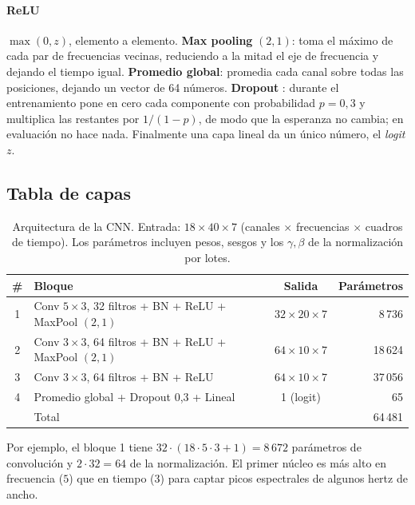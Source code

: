 \paragraph{ReLU} $\max(0, z)$, elemento a elemento. \textbf{Max pooling} $(2,1)$: toma el máximo de cada par de frecuencias
vecinas, reduciendo a la mitad el eje de frecuencia y dejando el tiempo igual. \textbf{Promedio global}: promedia cada
canal sobre todas las posiciones, dejando un vector de 64 números. \textbf{Dropout} \parencite{goodfellow2016}: durante el
entrenamiento pone en cero cada componente con probabilidad $p = 0{,}3$ y multiplica las restantes por $1/(1-p)$, de modo que
la esperanza no cambia; en evaluación no hace nada. Finalmente una capa lineal da un único número, el \emph{logit} $z$.

\subsection{Tabla de capas}

\begin{table}[ht]
\centering
\caption{Arquitectura de la CNN. Entrada: $18 \times 40 \times 7$ (canales $\times$ frecuencias $\times$ cuadros de tiempo).
Los parámetros incluyen pesos, sesgos y los $\gamma, \beta$ de la normalización por lotes.}
\label{tab:cnn_capas}
\begin{tabular}{clcr}
\toprule
\# & Bloque & Salida & Parámetros \\
\midrule
1 & Conv $5\times3$, 32 filtros + BN + ReLU + MaxPool $(2,1)$ & $32 \times 20 \times 7$ & 8\,736 \\
2 & Conv $3\times3$, 64 filtros + BN + ReLU + MaxPool $(2,1)$ & $64 \times 10 \times 7$ & 18\,624 \\
3 & Conv $3\times3$, 64 filtros + BN + ReLU                   & $64 \times 10 \times 7$ & 37\,056 \\
4 & Promedio global + Dropout 0,3 + Lineal                    & 1 (logit)               & 65 \\
\midrule
  & Total &  & 64\,481 \\
\bottomrule
\end{tabular}
\end{table}

Por ejemplo, el bloque 1 tiene $32\cdot(18\cdot5\cdot3 + 1) = 8\,672$ parámetros de convolución y $2\cdot32 = 64$ de la
normalización. El primer núcleo es más alto en frecuencia ($5$) que en tiempo ($3$) para captar picos espectrales de
algunos hertz de ancho.

